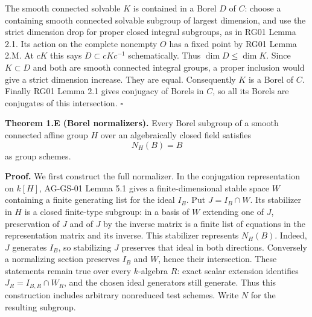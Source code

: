 \documentclass[11pt,a4paper,openany]{report}
\newcounter{none}
\begin{document}
The smooth connected solvable \(K\) is contained in a Borel \(D\) of \(C\): choose a containing smooth connected solvable subgroup of largest dimension, and use the strict dimension drop for proper closed integral subgroups, as in RG01 Lemma 2.1. Its action on the complete nonempty \(O\) has a fixed point by RG01 Lemma 2.M. At \(cK\) this says \(D\subset cKc^{-1}\) schematically. Thus \(\dim D\le\dim K\). Since \(K\subset D\) and both are smooth connected integral groups, a proper inclusion would give a strict dimension increase. They are equal. Consequently \(K\) is a Borel of \(C\). Finally RG01 Lemma 2.1 gives conjugacy of Borels in \(C\), so all its Borels are conjugates of this intersection. \(\square\)

\textbf{Theorem 1.E (Borel normalizers).} Every Borel subgroup of a smooth connected affine group \(H\) over an algebraically closed field satisfies \[
 N_H(B)=B
\] as group schemes.

\textbf{Proof.} We first construct the full normalizer. In the conjugation representation on \(k[H]\), AG-GS-01 Lemma 5.1 gives a finite-dimensional stable space \(W\) containing a finite generating list for the ideal \(I_B\). Put \(J=I_B\cap W\). Its stabilizer in \(H\) is a closed finite-type subgroup: in a basis of \(W\) extending one of \(J\), preservation of \(J\) and of \(J\) by the inverse matrix is a finite list of equations in the representation matrix and its inverse. This stabilizer represents \(N_H(B)\). Indeed, \(J\) generates \(I_B\), so stabilizing \(J\) preserves that ideal in both directions. Conversely a normalizing section preserves \(I_B\) and \(W\), hence their intersection. These statements remain true over every \(k\)-algebra \(R\): exact scalar extension identifies \(J_R=I_{B,R}\cap W_R\), and the chosen ideal generators still generate. Thus this construction includes arbitrary nonreduced test schemes. Write \(N\) for the resulting subgroup.
\end{document}

